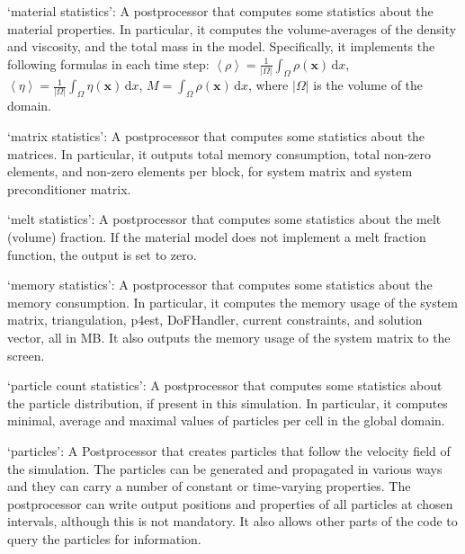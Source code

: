 \begin{itemize}

`material statistics': A postprocessor that computes some statistics about the material properties. In particular, it computes the volume-averages of the density and viscosity, and the total mass in the model. Specifically, it implements the following formulas in each time step: $\left<\rho\right> = \frac{1}{|\Omega|} \int_\Omega \rho(\mathbf x) \, \text{d}x$, $\left<\eta\right> = \frac{1}{|\Omega|} \int_\Omega \eta(\mathbf x) \, \text{d}x$, $M = \int_\Omega \rho(\mathbf x) \, \text{d}x$, where $|\Omega|$ is the volume of the domain.

`matrix statistics': A postprocessor that computes some statistics about the matrices. In particular, it outputs total memory consumption, total non-zero elements, and non-zero elements per block, for system matrix and system preconditioner matrix.

`melt statistics': A postprocessor that computes some statistics about the melt (volume) fraction. If the material model does not implement a melt fraction function, the output is set to zero.

`memory statistics': A postprocessor that computes some statistics about the memory consumption. In particular, it computes the memory usage of the system matrix, triangulation, p4est, DoFHandler, current constraints, and solution vector, all in MB. It also outputs the memory usage of the system matrix to the screen.

`particle count statistics': A postprocessor that computes some statistics about the particle distribution, if present in this simulation. In particular, it computes minimal, average and maximal values of particles per cell in the global domain.

`particles': A Postprocessor that creates particles that follow the velocity field of the simulation. The particles can be generated and propagated in various ways and they can carry a number of constant or time-varying properties. The postprocessor can write output positions and properties of all particles at chosen intervals, although this is not mandatory. It also allows other parts of the code to query the particles for information.


\end{itemize}
